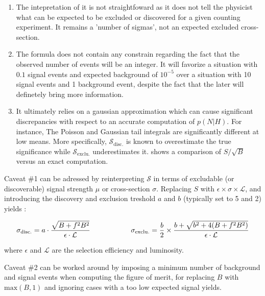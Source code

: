     \begin{enumerate}
        \item The intepretation of it is not straightfoward as it does not tell the
              physicist what can be expected to be excluded or discovered
              for a given counting experiment. It remains a 'number of sigmas', not an
              expected excluded cross-section.
        \item The formula  does not contain any constrain regarding the fact that
              the observed number of events will be an integer. It will favorize a situation
              with $0.1$ signal events and expected background of $10^{-5}$ over a
              situation with 10 signal events and 1 background event, despite the fact that
              the later will definetely bring more information.
        \item It ultimately relies on a gaussian approximation which can cause significant
              discrepancies with respect to an accurate computation of $p(N|H)$. For instance,
              The Poisson and Gaussian tail integrals are significantly different at low
              means. More specifically, $\mathcal{S}_\text{disc.}$ is known to overestimate
              the true significance while $\mathcal{S}_\text{exclu.}$ underestimates it.
               shows a comparison of $S/\sqrt{B}$ versus an exact
              computation.
    \end{enumerate}

    Caveat \#1 can be adressed by reinterpreting $\mathcal{S}$ in terms of excludable
    (or discoverable) signal strength $\mu$ or cross-section $\sigma$. Replacing
    $S$ with $\epsilon \times \sigma \times \mathcal{L}$, and introducing the discovery
    and exclusion treshold $a$ and $b$ (typically set to 5 and 2) yields :

    \begin{equation}
        \mathcal{\sigma}_\text{disc.} = a \cdot \frac{\sqrt{B+f^2B^2}}{\epsilon \cdot \mathcal{L}}
       \hspace*{2cm}
       \mathcal{\sigma}_\text{exclu.} = \frac{b}{2} \times \frac{b + \sqrt{b^2 + 4 (B + f^2B^2)}}{\epsilon \cdot \mathcal{L}}
       \label{FoM2}
    \end{equation}

    where $\epsilon$ and $\mathcal{L}$ are the selection efficiency and luminosity.

    Caveat \#2 can be worked around by imposing a minimum number of background and signal
    events when computing the figure of merit, for replacing $B$ with $\text{max}(B,1)$
    and ignoring cases with a too low expected signal yields.

